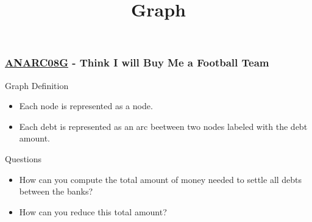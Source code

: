 \documentclass{beamer}
\title{Graph}
\newcommand{\ANAR}{\href{https://www.spoj.com/problems/ANARC08G/}{ANARC08G}}
\begin{document}
\frame{
  \titlepage
}



\begin{frame}[fragile]
  \frametitle{\ANAR{} - Think I will Buy Me a Football Team}

  \begin{block}{Graph Definition}
    \begin{itemize}
    \item Each node is represented as a node.
    \item Each debt is represented as an arc beetween two nodes labeled with the debt amount.
    \end{itemize}
  \end{block}


  \begin{exampleblock}{Questions}
    \begin{itemize}
    \item How can you compute the total amount of money needed to settle all debts between the banks?
    \item How can you reduce this total amount?  
    \end{itemize}
  \end{exampleblock}

\end{frame}
\end{document}
